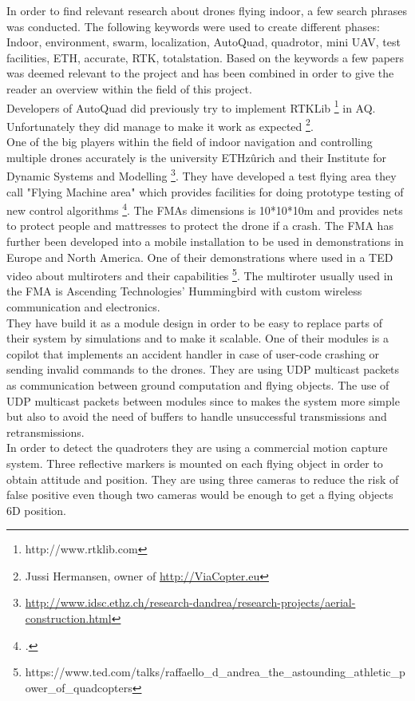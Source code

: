 In order to find relevant research about drones flying indoor, a few search phrases was conducted.
The following keywords were used to create different phases: Indoor, environment, swarm, localization, AutoQuad, quadrotor, mini UAV, test facilities, ETH, accurate, RTK, totalstation.
Based on the keywords a few papers was deemed relevant to the project and has been combined in order to give the reader an overview within the field of this project. \\

Developers of AutoQuad did previously try to implement RTKLib \footnote{http://www.rtklib.com} in AQ. Unfortunately they did manage to make it work as expected \footnote{Jussi Hermansen, owner of \url{http://ViaCopter.eu}}.\\

One of the big players within the field of indoor navigation and controlling multiple drones accurately is the university ETHzûrich and their Institute for Dynamic Systems and Modelling \footnote{\url{http://www.idsc.ethz.ch/research-dandrea/research-projects/aerial-construction.html}}. They have developed a test flying area they call "Flying Machine area" which provides facilities for doing prototype testing of new control algorithms \footcite{lupashin2014platform}. The FMAs dimensions is 10*10*10m and provides nets to protect people and mattresses to protect the drone  if a crash. The FMA has further been developed into a mobile installation to be used in demonstrations in Europe and North America. One of their demonstrations where used in a TED video about multiroters and their capabilities \footnote{https://www.ted.com/talks/raffaello\_d\_andrea\_the\_astounding\_athletic\_power\_of\_quadcopters}.
The multiroter usually used in the FMA is Ascending Technologies' Hummingbird with custom wireless communication and electronics. \\
They have build it as a module design in order to be easy to replace parts of their system by simulations and to make it scalable.
One of their modules is a copilot that implements an accident handler in case of user-code crashing or sending invalid commands to the drones.
They are using UDP multicast packets as communication between ground computation and flying objects. The use of UDP multicast packets between modules since to makes the system more simple but also to avoid the need of buffers to handle unsuccessful transmissions and retransmissions. \\
In order to detect the quadroters they are using a commercial motion capture system. Three reflective markers is mounted on each flying object in order to obtain attitude and position. They are using three cameras to reduce the risk of false positive even though two cameras would be enough to get a flying objects 6D position.\\
 
